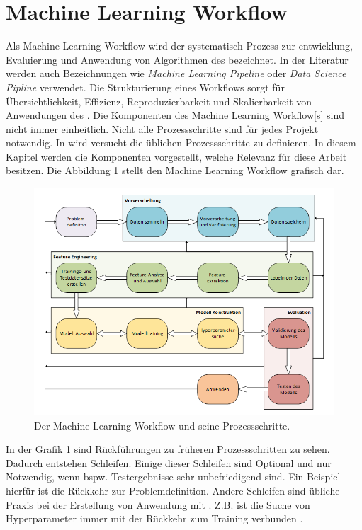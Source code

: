 \section{Machine Learning Workflow} \label{sec:MLWF}
Als \gls{Machine Learning Workflow} wird der systematisch Prozess zur entwicklung, Evaluierung und Anwendung von Algorithmen des  bezeichnet. In der Literatur werden auch Bezeichnungen wie \textit{Machine Learning Pipeline} oder \textit{Data Science Pipline} verwendet. Die Strukturierung eines Workflows sorgt für Übersichtlichkeit, Effizienz, Reproduzierbarkeit und Skalierbarkeit von Anwendungen des . Die Komponenten des \gls{Machine Learning Workflow}[s] sind nicht immer einheitlich. Nicht alle Prozessschritte sind für jedes Projekt notwendig. In \cite{Biswas.2022} wird versucht die üblichen Prozessschritte zu definieren. In diesem Kapitel werden die Komponenten vorgestellt, welche Relevanz für diese Arbeit besitzen. Die Abbildung \ref{fig:MLWorkflow} stellt den \gls{Machine Learning Workflow} grafisch dar.

\begin{figure}[htb]
    \centering
    \includegraphics[width=\textwidth]{img/Grafiken/Machine Learning Workflow.png}
    \caption[Der Machine Learning Workflow]{Der \gls{Machine Learning Workflow} und seine Prozessschritte.}
    \label{fig:MLWorkflow}
\end{figure}


In der Grafik \ref{fig:MLWorkflow} sind Rückführungen zu früheren Prozessschritten zu sehen. Dadurch entstehen Schleifen. Einige dieser Schleifen sind Optional und nur Notwendig, wenn bspw. Testergebnisse sehr unbefriedigend sind. Ein Beispiel hierfür ist die Rückkehr zur Problemdefinition. Andere Schleifen sind übliche Praxis bei der Erstellung von Anwendung mit . Z.B. ist die Suche von \gls{Hyperparameter} immer mit der Rückkehr zum Training verbunden \cite{Biswas.2022, Zheng.2018, Zheng.2015, Elshawi.2019}. 

